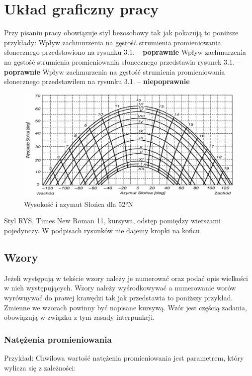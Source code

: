 \documentclass[11pt]{extreport}
\begin{document}
\chapter{Układ graficzny pracy}

Przy pisaniu pracy obowiązuje styl bezosobowy tak jak pokazują to poniższe przykłady: 
Wpływ zachmurzenia na gęstość strumienia promieniowania słonecznego przedstawiono na rysunku 3.1.  – \textbf{poprawnie}
Wpływ zachmurzenia na gęstość strumienia promieniowania słonecznego przedstawia rysunek 3.1.  – \textbf{poprawnie}
Wpływ zachmurzenia na gęstość strumienia promieniowania słonecznego przedstawiłem na rysunku 3.1. – \textbf{niepoprawnie}

\begin{figure}[ht]
    \centering
    \includegraphics[width=0.80\linewidth]{images/Obraz2.png}
    \caption{Wysokość i azymut Słońca dla 52°N \cite{dirac} }
    \label{fig:Obraz2}
\end{figure}
Styl RYS, Times New Roman 11, kursywa, odstęp pomiędzy wierszami pojedynczy. W podpisach rysunków nie dajemy kropki na końcu

\section{Wzory} %

Jeżeli występują w tekście wzory należy je numerować oraz podać opis wielkości w nich występujących. Wzory należy wyśrodkowywać a numerowanie worów wyrównywać do prawej krawędzi tak jak przedstawia to poniższy przykład. Zmienne we wzorach powinny być napisane kursywą. Wzór jest częścią zadania, obowiązują w związku z tym zasady interpunkcji.   

\subsection{Natężenia promieniowania } %

Przykład:
Chwilowa wartość natężenia promieniowania jest parametrem, który wylicza się z zależności:
\end{document}
